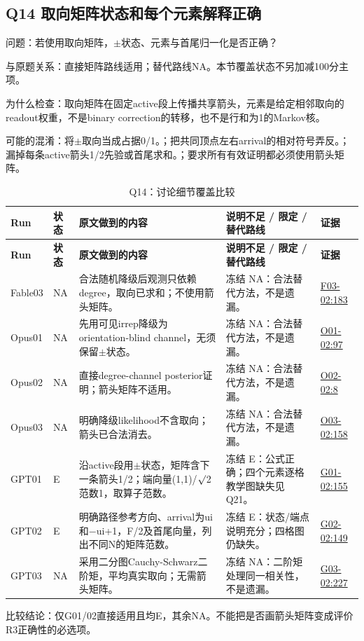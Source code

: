 \documentclass[11pt,a4paper]{article}
\begin{document}
\clearpage
\subsection{Q14 取向矩阵状态和每个元素解释正确}
\label{aspect:Q14}
问题：若使用取向矩阵，\ensuremath{\pm}状态、元素与首尾归一化是否正确？

与原题关系：直接矩阵路线适用；替代路线NA。本节覆盖状态不另加减100分主项。

为什么检查：取向矩阵在固定active段上传播共享箭头，元素是给定相邻取向的readout权重，不是binary correction的转移，也不是行和为1的Markov核。

可能的混淆：将\ensuremath{\pm}取向当成占据0/1。；把共同顶点左右arrival的相对符号弄反。；漏掉每条active箭头1/2先验或首尾求和。；要求所有有效证明都必须使用箭头矩阵。

{\fontsize{9.0}{12.6}\selectfont
\setlength{\tabcolsep}{2.5pt}
\begin{longtable}{>{\raggedright\arraybackslash}p{}>{\raggedright\arraybackslash}p{}>{\raggedright\arraybackslash}p{}>{\raggedright\arraybackslash}p{}>{\raggedright\arraybackslash}p{}}
\caption{Q14：讨论细节覆盖比较}\\
\toprule
\textbf{Run} & \textbf{状态} & \textbf{原文做到的内容} & \textbf{说明不足 / 限定 / 替代路线} & \textbf{证据}\tabularnewline
\midrule
\endfirsthead
\toprule
\textbf{Run} & \textbf{状态} & \textbf{原文做到的内容} & \textbf{说明不足 / 限定 / 替代路线} & \textbf{证据}\tabularnewline
\midrule
\endhead
{}Fable03 & NA & 合法随机降级后观测只依赖degree，取向已求和；不使用箭头矩阵。 & 冻结 NA：合法替代方法，不是遗漏。 & \hyperref[src:F03-02]{F03-02:183}\tabularnewline
{}Opus01 & NA & 先用可见irrep降级为orientation-blind channel，无须保留\ensuremath{\pm}状态。 & 冻结 NA：合法替代方法，不是遗漏。 & \hyperref[src:O01-02]{O01-02:97}\tabularnewline
{}Opus02 & NA & 直接degree-channel posterior证明；箭头矩阵不适用。 & 冻结 NA：合法替代方法，不是遗漏。 & \hyperref[src:O02-02]{O02-02:8}\tabularnewline
{}Opus03 & NA & 明确降级likelihood不含取向；箭头已合法消去。 & 冻结 NA：合法替代方法，不是遗漏。 & \hyperref[src:O03-02]{O03-02:158}\tabularnewline
{}GPT01 & E & 沿active段用\ensuremath{\pm}状态，矩阵含下一条箭头1/2；端向量(1,1)/\ensuremath{\surd}2范数1，取算子范数。 & 冻结 E：公式正确；四个元素逐格教学图缺失见Q21。 & \hyperref[src:G01-02]{G01-02:155}\tabularnewline
{}GPT02 & E & 明确路径参考方向、arrival为ui和\ensuremath{-}ui+1，F/2及首尾向量，列出不同N的矩阵范数。 & 冻结 E：状态/端点说明充分；四格图仍缺失。 & \hyperref[src:G02-02]{G02-02:149}\tabularnewline
{}GPT03 & NA & 采用二分图Cauchy-Schwarz二阶矩，平均真实取向；无需箭头矩阵。 & 冻结 NA：二阶矩处理同一相关性，不是遗漏。 & \hyperref[src:G03-02]{G03-02:227}\tabularnewline
\bottomrule
\end{longtable}
}
比较结论：仅G01/02直接适用且均E，其余NA。不能把是否画箭头矩阵变成评价R3正确性的必选项。
\end{document}
